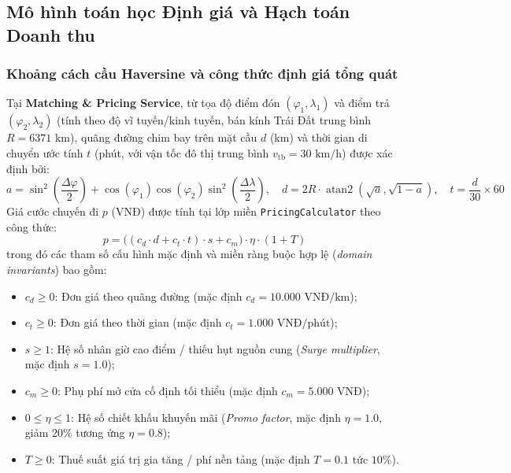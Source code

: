 \documentclass[12pt,a4paper]{article}
\begin{document}
\subsection{Mô hình toán học Định giá và Hạch toán Doanh thu}
\subsubsection{Khoảng cách cầu Haversine và công thức định giá tổng quát}
Tại \textbf{Matching \& Pricing Service}, từ tọa độ điểm đón $(\varphi_1, \lambda_1)$ và điểm trả $(\varphi_2, \lambda_2)$ (tính theo độ vĩ tuyến/kinh tuyến, bán kính Trái Đất trung bình $R = 6371\text{ km}$), quãng đường chim bay trên mặt cầu $d$ (km) và thời gian di chuyển ước tính $t$ (phút, với vận tốc đô thị trung bình $v_{\text{tb}} = 30\text{ km/h}$) được xác định bởi:
\begin{equation}
    a = \sin^2\!\left(\frac{\Delta \varphi}{2}\right) + \cos(\varphi_1)\cos(\varphi_2)\sin^2\!\left(\frac{\Delta \lambda}{2}\right), \quad
    d = 2R \cdot \operatorname{atan2}\!\left(\sqrt{a}, \sqrt{1-a}\right), \quad
    t = \frac{d}{30} \times 60
\end{equation}
Giá cước chuyến đi $p$ (VNĐ) được tính tại lớp miền \texttt{PricingCalculator} theo công thức:
\begin{equation}
    p = \bigl((c_d \cdot d + c_t \cdot t) \cdot s + c_m\bigr) \cdot \eta \cdot (1 + T)
\end{equation}
trong đó các tham số cấu hình mặc định và miền ràng buộc hợp lệ (\textit{domain invariants}) bao gồm:
\begin{itemize}[nosep]
    \item $c_d \ge 0$: Đơn giá theo quãng đường (mặc định $c_d = 10.000\text{ VNĐ/km}$);
    \item $c_t \ge 0$: Đơn giá theo thời gian (mặc định $c_t = 1.000\text{ VNĐ/phút}$);
    \item $s \ge 1$: Hệ số nhân giờ cao điểm / thiếu hụt nguồn cung (\textit{Surge multiplier}, mặc định $s = 1.0$);
    \item $c_m \ge 0$: Phụ phí mở cửa cố định tối thiểu (mặc định $c_m = 5.000\text{ VNĐ}$);
    \item $0 \le \eta \le 1$: Hệ số chiết khấu khuyến mãi (\textit{Promo factor}, mặc định $\eta = 1.0$, giảm $20\%$ tương ứng $\eta = 0.8$);
    \item $T \ge 0$: Thuế suất giá trị gia tăng / phí nền tảng (mặc định $T = 0.1$ tức $10\%$).
\end{itemize}
\end{document}
